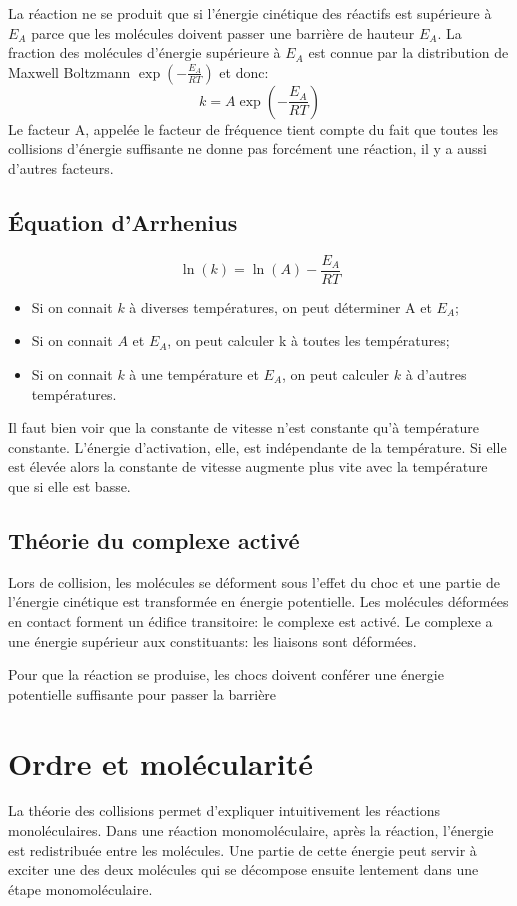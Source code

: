 La réaction ne se produit que si l'énergie cinétique des réactifs est
supérieure à $E_A$ parce que les molécules
doivent passer une barrière de hauteur $E_A$.
La fraction des molécules d'énergie supérieure à
$E_A$ est connue par la distribution de Maxwell Boltzmann
$\exp \left(-\frac{E_A}{RT}\right)$ et donc:
\[ k = A \exp \left(-\frac{E_A}{RT}\right) \]
Le facteur A, appelée le facteur de fréquence tient compte du fait
que toutes les collisions d'énergie suffisante ne donne pas
forcément une réaction, il y a aussi d'autres facteurs.

\subsection{Équation d'Arrhenius}
\[ \ln(k) = \ln(A)-\frac{E_A}{RT} \]
\begin{itemize}
  \item Si on connait $k$ à diverses températures,
    on peut déterminer A et $E_A$;
  \item Si on connait $A$ et $E_A$,
    on peut calculer k à toutes les températures;
  \item Si on connait $k$ à une température et $E_A$,
    on peut calculer $k$ à d'autres températures.
\end{itemize}
Il faut bien voir que la constante de vitesse
n'est constante qu'à température constante.
L'énergie d'activation, elle, est indépendante de la température.
Si elle est élevée alors la constante de vitesse augmente
plus vite avec la température que si elle est basse.

\subsection{Théorie du complexe activé}
Lors de collision, les molécules se déforment sous l'effet du choc et
une partie de l'énergie cinétique est transformée en énergie potentielle.
Les molécules déformées en contact forment un édifice transitoire:
le complexe est activé.
Le complexe a une énergie supérieur aux constituants:
les liaisons sont déformées.

Pour que la réaction se produise,
les chocs doivent conférer une énergie potentielle
suffisante pour passer la barrière

\section{Ordre et molécularité}
La théorie des collisions permet d'expliquer
intuitivement les réactions monoléculaires.
Dans une réaction monomoléculaire, après la réaction,
l'énergie est redistribuée entre les molécules.
Une partie de cette énergie peut servir à exciter une des deux molécules qui
se décompose ensuite lentement dans une étape monomoléculaire.

